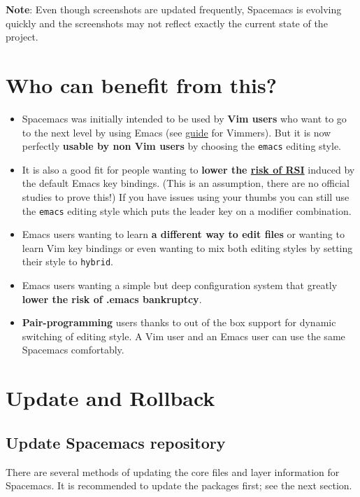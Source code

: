 \documentclass[11pt]{article}
\begin{document}
\textbf{Note}: Even though screenshots are updated frequently, Spacemacs is evolving
quickly and the screenshots may not reflect exactly the current state of the
project.

\section{Who can benefit from this?}
\label{sec:orgc314219}
\begin{itemize}
\item Spacemacs was initially intended to be used by \textbf{Vim users} who want to go to
the next level by using Emacs (see \href{VIMUSERS.org}{guide} for Vimmers). But it is now
perfectly \textbf{usable by non Vim users} by choosing the \texttt{emacs} editing style.

\item It is also a good fit for people wanting to \textbf{lower the \href{http://en.wikipedia.org/wiki/Repetitive\_strain\_injury}{risk of RSI}} induced by
the default Emacs key bindings. (This is an assumption, there are no official
studies to prove this!) If you have issues using your thumbs you can still
use the \texttt{emacs} editing style which puts the leader key on a modifier
combination.

\item Emacs users wanting to learn \textbf{a different way to edit files} or wanting to
learn Vim key bindings or even wanting to mix both editing styles by setting
their style to \texttt{hybrid}.

\item Emacs users wanting a simple but deep configuration system that greatly
\textbf{lower the risk of .emacs bankruptcy}.

\item \textbf{Pair-programming} users thanks to out of the box support for dynamic
switching of editing style. A Vim user and an Emacs user can use the same
Spacemacs comfortably.
\end{itemize}

\section{Update and Rollback}
\label{sec:org07a4b7a}
\subsection{Update Spacemacs repository}
\label{sec:org4b00a0b}
There are several methods of updating the core files and layer information for
Spacemacs. It is recommended to update the packages first; see the next section.
\end{document}
